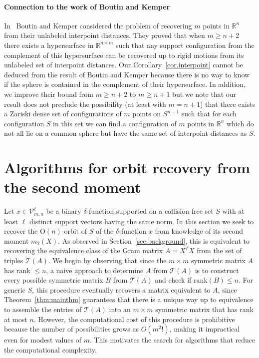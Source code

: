 \documentclass{article}
\theoremstyle{definition}
\renewcommand{\r}{\mathbb{R}}
\renewcommand{\|}{|}
\renewcommand{\t}{\mathcal{T}}
\newcommand{\V}{\mathcal{V}}
\renewcommand{\O}{\mathrm{O}}
\begin{document}
\paragraph{{\bf Connection to the work of Boutin and Kemper}}
In~\cite{boutin2003reconstructing} Boutin and Kemper considered the problem of recovering
    $m$ points in $\r^n$ from their unlabeled interpoint distances.
    They proved that when $m \geq n+2$ 
    there exists a hypersurface in $\r^{n\times m}$ such that any support configuration from the complement of this hypersurface can be recovered up to rigid motions from its unlabeled set of interpoint distances. 
    Our Corollary~\ref{cor.interpoint} cannot be deduced from the result of Boutin and Kemper because there is no way to know if the sphere is contained in the complement of their hypersurface. In addition, we improve their bound from $m \geq n+2$ to $m \geq n+1$ but we note that our result does not preclude the possibility (at least with $m = n+1$) that
    there exists a Zariski dense set of configurations of $m$ points on $S^{n-1}$ such that for each 
    configuration $S$ in this set we can find a configuration of $m$ points in $\r^n$ which do not all lie on a common sphere but have the same set of interpoint distances as $S$.

\section{Algorithms for orbit recovery from the second moment}\label{sec:recoveringx}
Let $x \in \V_{m,n}^\ell$ be a binary $\delta$-function supported on a collision-free set $S$ with at least $\ell$ distinct support vectors having the same norm. In this section we seek to recover the $\O(n)$-orbit of $S$ of the $\delta$-function $x$ from knowledge of its second moment $m_2(X)$. 
As observed in Section~\ref{sec:background}, this is equivalent to recovering the equivalence class of the Gram matrix $A = X^TX$ 
from the set of triples $\t(A)$.
We begin by observing that since the $m\times m$ symmetric matrix $A$ has rank $\leq n$, a naive approach to determine $A$ from $\t(A)$ is to construct every possible symmetric matrix $B$ from $\t(A)$ and check if $\mathrm{rank}(B) \leq n$. For generic $S$, this procedure eventually recovers 
a matrix equivalent to $A$, since Theorem~\ref{thm:mainthm} guarantees that there is a unique way up to equivalence to assemble the entries of $\t(A)$ into an $m\times m$ symmetric matrix that has rank at most $n$. 
However, the computational cost of this procedure is prohibitive because the number of possibilities grows as $O(m^2!)$, making it impractical even for modest values of $m$. This motivates the search for algorithms that reduce the computational complexity.
\end{document}
